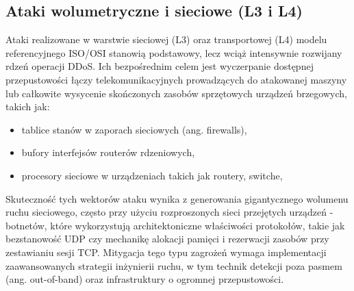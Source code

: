 \documentclass[a4paper,12pt]{article}
\begin{document}
\subsection{Ataki wolumetryczne i sieciowe (L3 i L4)}
Ataki realizowane w warstwie sieciowej (L3) oraz transportowej (L4) modelu referencyjnego ISO/OSI stanowią podstawowy, lecz wciąż intensywnie rozwijany rdzeń operacji DDoS. Ich bezpośrednim celem jest wyczerpanie dostępnej przepustowości łączy telekomunikacyjnych prowadzących do atakowanej maszyny lub całkowite wysycenie skończonych zasobów sprzętowych urządzeń brzegowych, takich jak:
\begin{itemize}
    \item tablice stanów w zaporach sieciowych (ang. firewalls),
    \item bufory interfejsów routerów rdzeniowych,
    \item procesory sieciowe w urządzeniach takich jak routery, switche,
\end{itemize}
Skuteczność tych wektorów ataku wynika z generowania gigantycznego wolumenu ruchu sieciowego, często przy użyciu rozproszonych sieci przejętych urządzeń - botnetów, które wykorzystują architektoniczne właściwości protokołów, takie jak bezstanowość UDP czy mechanikę alokacji pamięci i rezerwacji zasobów przy zestawianiu sesji TCP. Mitygacja tego typu zagrożeń wymaga implementacji zaawansowanych strategii inżynierii ruchu, w tym technik detekcji poza pasmem (ang. out-of-band) oraz infrastruktury o ogromnej przepustowości.
\end{document}
